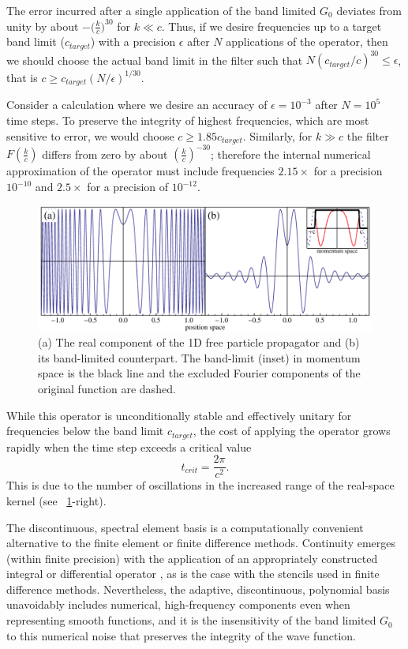 \documentclass[review,letterpaper]{elsarticle}
\begin{document}
The error incurred after a single application of the band limited $G_0$ deviates from unity by about $-{(\frac k c})^{30}$ for $k \ll c$.
Thus, if we desire frequencies up to a target band limit ($c_{target}$) with a precision
$\epsilon$ after  $N$ applications of the operator, then we should choose the actual band limit in
the filter such that $N(c_{target}/c)^{30}\le \epsilon$, that is $c\ge c_{target}(N/\epsilon )^{1/30}$.

Consider a calculation where we desire an accuracy of $\epsilon = 10^{-3}$ after $N = 10^5$ time steps.
To preserve the integrity of highest frequencies, which are most sensitive to error, we would choose
$c\ge 1.85c_{target}$. Similarly, for  $k\gg c$ the filter  $F(\frac k c)$ differs from zero by about  $(\frac k c)^{-30}$;
therefore the internal numerical approximation of the operator must include frequencies
 $2.15\times$ for a precision $10^{-10}$ and $2.5\times$ for a precision of $10^{-12}$.

\begin{figure}[ht]
\centering
\includegraphics[width=4.5in]{freePP}
\caption{(a) The real component of the 1D free particle propagator and (b) its band-limited counterpart. The band-limit (inset) in momentum space is the black line and the excluded Fourier components of the original function are dashed. }
\label{F:g0}
\end{figure}

While this operator is unconditionally stable and effectively unitary for frequencies below the
band limit  $c_{target}$, the cost of applying the operator grows rapidly when the time step exceeds
a critical value
\begin{equation}
t_{crit}=\frac{2\pi }{c^{2}}.
\end{equation}
This is due to the number of oscillations in the increased range of the real-space kernel
(see \figurename~\ref{F:g0}-right).

The discontinuous, spectral element basis is a computationally convenient
alternative to the finite element or finite difference methods.
Continuity emerges (within finite precision) with the application
of an appropriately constructed integral or differential operator \cite{Alpert:2002cx},
as is the case with the stencils used in finite difference methods.
Nevertheless, the adaptive, discontinuous, polynomial basis unavoidably
includes numerical, high-frequency components even when representing
smooth functions, and it is the insensitivity of the band limited $G_0$ to this
numerical noise that preserves the integrity of the wave function.
\end{document}
